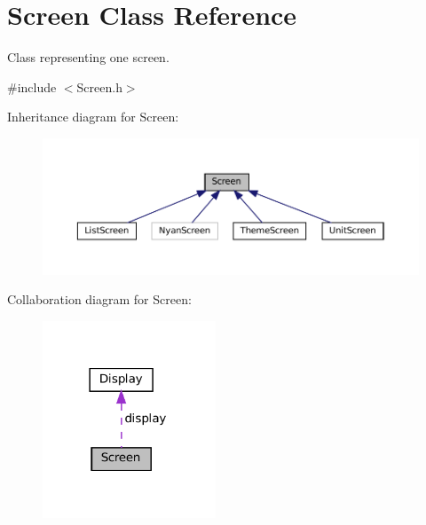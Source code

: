 \hypertarget{classScreen}{}\section{Screen Class Reference}
\label{classScreen}


Class representing one screen.  




{\ttfamily \#include $<$Screen.\+h$>$}



Inheritance diagram for Screen\+:\nopagebreak
\begin{figure}[H]
\begin{center}
\leavevmode
\includegraphics[width=350pt]{classScreen__inherit__graph}
\end{center}
\end{figure}


Collaboration diagram for Screen\+:\nopagebreak
\begin{figure}[H]
\begin{center}
\leavevmode
\includegraphics[width=146pt]{classScreen__coll__graph}
\end{center}
\end{figure}
